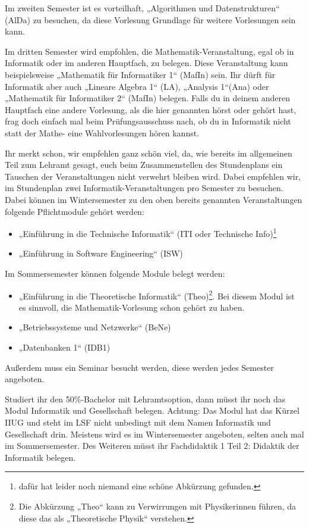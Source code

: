 Im zweiten Semester ist es vorteilhaft, „Algorithmen und Datenstrukturen“ (\gls{AlDa}) zu besuchen, da diese Vorlesung Grundlage für weitere Vorlesungen sein kann. 

Im dritten Semester wird empfohlen, die Mathematik-Veranstaltung, egal ob in Informatik oder im anderen Hauptfach, zu belegen. Diese Veranstaltung kann beispielsweise „Mathematik für Informatiker 1“ (\gls{MafIn}) sein. Ihr dürft für Informatik aber auch „Lineare Algebra 1“ (\gls{LA}), „Analysis 1“(\gls{Ana}) oder „Mathematik für Informatiker 2“ (\gls{MafIn}) belegen. Falls du in deinem anderen Hauptfach eine andere Vorlesung, als die hier genannten hörst oder gehört hast, frag doch einfach mal beim Prüfungsausschuss nach, ob du in Informatik nicht statt der Mathe- eine Wahlvorlesungen hören kannst.

Ihr merkt schon, wir empfehlen ganz schön viel, da, wie bereits im allgemeinen Teil zum Lehramt gesagt, euch beim Zusammenstellen des Stundenplans ein Tauschen der Veranstaltungen nicht verwehrt bleiben wird. Dabei empfehlen wir, im Stundenplan zwei Informatik-Veranstaltungen pro Semester zu besuchen. Dabei können im Wintersemester zu den oben bereits genannten Veranstaltungen folgende Pflichtmodule gehört werden: 
\begin{itemize}
    \item „Einführung in die Technische Informatik“ (\gls{ITI} oder Technische Info)\footnote{dafür hat leider noch niemand eine schöne Abkürzung gefunden.}
    \item „Einführung in Software Engineering“ (\gls{ISW})
\end{itemize}
Im Sommersemester können folgende Module belegt werden:
\begin{itemize}
    \item „Einführung in die Theoretische Informatik“ (\gls{Theo})\footnote{Die Abkürzung „Theo“ kann zu Verwirrungen mit Physikerinnen führen, da diese das als „Theoretische Physik“ verstehen.}. Bei diesem Modul ist es sinnvoll, die Mathematik-Vorlesung schon gehört zu haben.
    \item „Betriebssysteme und Netzwerke“ (\gls{BeNe})
    \item „Datenbanken 1“ (\gls{IDB1})
\end{itemize}
Außerdem muss ein Seminar besucht werden, diese werden jedes Semester angeboten. 

Studiert ihr den 50\%-Bachelor mit Lehramtsoption, dann müsst ihr noch das Modul Informatik und Gesellschaft belegen. Achtung: Das Modul hat das Kürzel IIUG und steht im LSF nicht unbedingt mit dem Namen Informatik und Gesellschaft drin. Meistens wird es im Wintersemester angeboten, selten auch mal im Sommersemester. Des Weiteren müsst ihr Fachdidaktik 1 Teil 2: Didaktik der Informatik belegen. 

